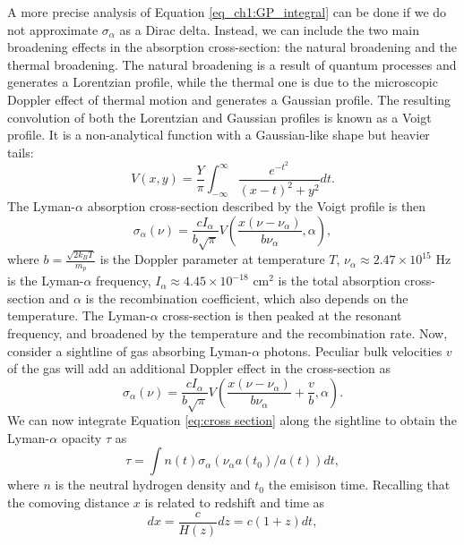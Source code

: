 A more precise analysis of Equation \ref{eq_ch1:GP_integral} can be done if we do not approximate $\sigma_\alpha$ as a Dirac delta. Instead, we can include the two main broadening effects in the absorption cross-section: the natural broadening and the thermal broadening. The natural broadening is a result of quantum processes and generates a Lorentzian profile, while the thermal one is due to the microscopic Doppler effect of thermal motion and generates a Gaussian profile. The resulting convolution of both the Lorentzian and Gaussian profiles is known as a Voigt profile. It is a non-analytical function with a Gaussian-like shape but heavier tails:
\begin{equation}\label{eq: Voigt}
    V(x,y)=\frac{Y}{\pi}\int_{-\infty}^{\infty}\frac{e^{-t^2}}{(x-t)^2+y^2} dt.
\end{equation}
The Lyman-$\alpha$ absorption cross-section described by the Voigt profile is then
\begin{equation}
    \sigma_\alpha(\nu)=\frac{cI_\alpha}{b\sqrt{\pi}} V\left(\frac{x(\nu-\nu_\alpha)}{b\nu_\alpha}, \alpha  \right),
\end{equation}
where $b=\frac{\sqrt{2k_BT}}{m_p}$ is the Doppler parameter at temperature $T$, $\nu_\alpha \approx 2.47\times 10^{15}$ Hz is the Lyman-$\alpha$ frequency, $I_\alpha \approx 4.45\times 10^{-18}$ cm$^{2}$ is the total absorption cross-section \cite{Mo2010} and $\alpha$ is the recombination coefficient, which also depends on the temperature.
The Lyman-$\alpha$ cross-section is then peaked at the resonant frequency, and broadened by the temperature and the recombination rate. Now, consider a sightline of gas absorbing Lyman-$\alpha$ photons. Peculiar bulk velocities $v$ of the gas will add an additional Doppler effect in the cross-section as
\begin{equation}\label{eq:cross section}
    \sigma_\alpha(\nu)=\frac{cI_\alpha}{b\sqrt{\pi}} V\left(\frac{x(\nu-\nu_\alpha)}{b\nu_\alpha} +\frac{v}{b}, \alpha  \right).
\end{equation}
We can now integrate Equation \ref{eq:cross section} along the sightline to obtain the Lyman-$\alpha$ opacity $\tau$ as
\begin{equation}
    \tau = \int n(t)\sigma_\alpha(\nu_\alpha a(t_0)/a(t)) dt,
\end{equation}
where $n$ is the neutral hydrogen density and $t_0$ the emisison time.
Recalling that the comoving distance $x$ is related to redshift and time as 
\begin{equation}
    dx=\frac{c}{H(z)}dz=c(1+z)dt,
\end{equation}
